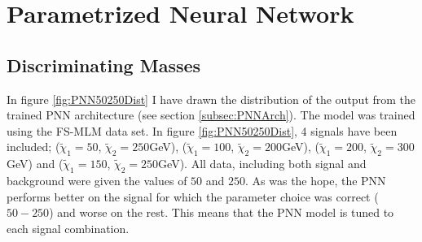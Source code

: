 \section{Parametrized Neural Network}
\subsection{Discriminating Masses}
In figure \ref{fig:PNN50250Dist} I have drawn the distribution of the output from the trained \ac{PNN} architecture 
(see section \ref{subsec:PNNArch}). The model was trained using the FS-MLM data set. In figure \ref{fig:PNN50250Dist},
4 signals have been included; ($\tilde{\chi}_1=50$, $\tilde{\chi}_2=250$GeV), ($\tilde{\chi}_1=100$, $\tilde{\chi}_2=200$GeV), 
($\tilde{\chi}_1=200$, $\tilde{\chi}_2=300$GeV) and ($\tilde{\chi}_1=150$, $\tilde{\chi}_2=250$GeV). All data, including 
both signal and background were given the values of $50$ and $250$. As was the hope, the \ac{PNN} performs better on 
the signal for which the parameter choice was correct ($50-250$) and worse on the rest. This means
that the \ac{PNN} model is tuned to each signal combination.
